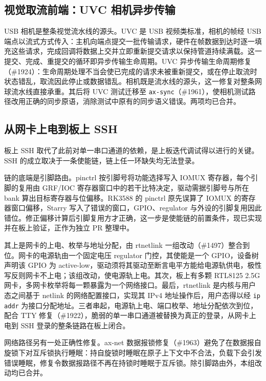 \subsection{视觉取流前端：UVC 相机异步传输}

USB 相机是整条视觉流水线的源头。UVC 是 USB 视频类标准，相机的帧经 USB 端点以流式方式传入：主机向端点提交一批传输请求，硬件在帧数据到达时逐一填充这些请求，完成回调将数据上交并立即重新提交请求以保持管道持续满载。这一提交、完成、重提交的循环即异步传输生命周期。UVC 异步传输生命周期修复（\#1924）：生命周期处理不当会使已完成的请求未被重新提交，或在停止取流时状态错乱，取流因此停止或数据错乱。相机既是流水线的源头，这一修复对整条网球流水线直接承重。其后将 UVC 测试迁移至 \texttt{ax-sync}（\#1961），使相机测试路径改用正确的同步原语，消除测试中原有的同步语义错误。两项均已合并。

\subsection{从网卡上电到板上 SSH}

板上 SSH 取代了此前对单一串口通道的依赖，是上板迭代调试得以进行的关键。SSH 的成立取决于一条使能链，链上任一环缺失均无法登录。

链的底端是引脚路由。pinctrl 按引脚号将功能选择写入 IOMUX 寄存器，每个引脚的复用由 GRF/IOC 寄存器窗口中的若干比特决定，驱动需据引脚号与所在 bank 算出目标寄存器与位偏移。RK3588 的 pinctrl 原先误算了 IOMUX 的寄存器窗口偏移，Starry 写入了错误的窗口，GPIO、regulator 与外设的引脚复用因此错位。修正偏移计算后引脚复用方才正确，这一步是使能链的前置条件，现已实现并在板上验证，正作为独立 PR 整理中。

其上是网卡的上电、枚举与地址分配，由 rtnetlink 一组改动（\#1497）整合到位。网卡的电源轨由一个固定电压 regulator 门控，其使能是一个 GPIO，设备树声明该 GPIO 为 active-low，驱动须将其驱动至断言电平方能给电源轨供电，极性写反则网卡不上电；该组改动，使电源轨上电。其次，板上有多颗 RTL8125 2.5G 网卡，多网卡枚举将每一颗暴露为一个网络接口。最后，rtnetlink 是内核与用户态之间基于 netlink 的网络配置接口，实现其 IPv4 地址操作后，用户态得以经 \texttt{ip addr} 为接口分配地址。三者串起，电源轨上电、端口枚举、地址分配依次到位，配合 TTY 修复（\#1922），脆弱的单一串口通道被替换为真正的登录，从网卡上电到 SSH 登录的整条链路在板上闭合。

网络路径另有一处正确性修复。ax-net 数据报锁修复（\#1963）避免了在数据报自旋锁下对互斥锁执行睡眠：持自旋锁时睡眠在原子上下文中不合法，负载下会引发错误睡眠，修复令数据报路径不再在持锁时睡眠于互斥锁。除引脚路由外，本组改动均已合并。

